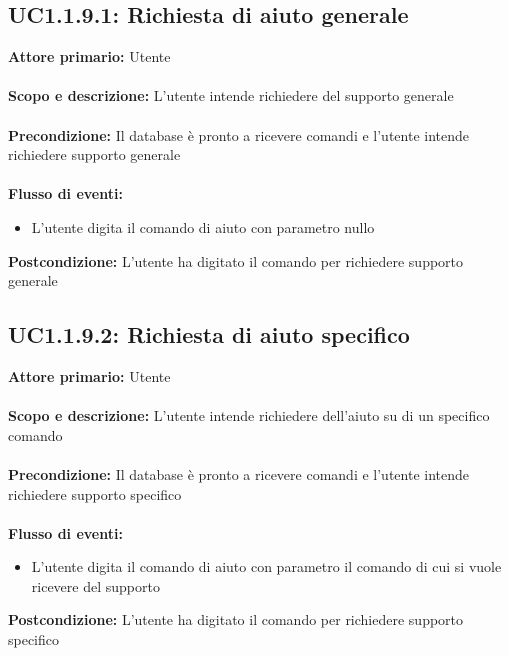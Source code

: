 \documentclass{scalatekids-article}
\begin{document}
\subsection{UC1.1.9.1: Richiesta di aiuto generale}
\textbf{Attore primario:} Utente \\ \\
\textbf{Scopo e descrizione:} L’utente intende richiedere del supporto generale\\ \\
\textbf{Precondizione:} Il database è pronto a ricevere comandi e l’utente intende richiedere supporto generale\\ \\
\textbf{Flusso di eventi:}
\begin{itemize}
\item L’utente digita il comando di aiuto con parametro nullo
\end{itemize}
\textbf{Postcondizione:} L’utente ha digitato il comando per richiedere supporto generale
\subsection{UC1.1.9.2: Richiesta di aiuto specifico}
\textbf{Attore primario:} Utente \\ \\
\textbf{Scopo e descrizione:} L’utente intende richiedere dell’aiuto su di un specifico comando\\ \\
\textbf{Precondizione:} Il database è pronto a ricevere comandi e l’utente intende richiedere supporto specifico\\ \\
\textbf{Flusso di eventi:}
\begin{itemize}
\item L’utente digita il comando di aiuto con parametro il comando di cui si vuole ricevere del supporto
\end{itemize}
\textbf{Postcondizione:} L’utente ha digitato il comando per richiedere supporto specifico
\end{document}
